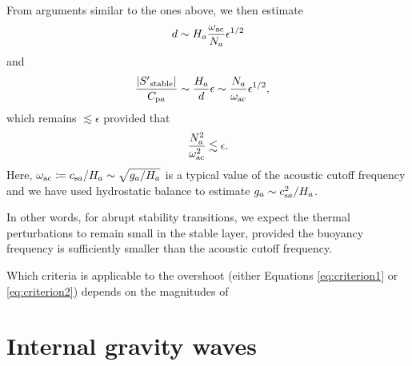 \documentclass[12pt]{article}
\newcommand{\csa}{c_{{\rm s}a}}
\newcommand{\cpa}{C_{{\rm p}a}}
\newcommand{\omac}{\omega_{\rm ac}}
\newcommand{\sstable}{|\entrprime_{\rm stable}|}
\begin{document}
 From arguments similar to the ones above, we then estimate
 \begin{align}
 	d\sim H_a\frac{\omac}{N_a}\epsilon^{1/2}
\end{align}
and 
\begin{align}\label{eq:entrpert2}
	\frac{\sstable}{\cpa} &\sim \frac{H_a}{d}\epsilon\sim \frac{N_a}{\omac}\epsilon^{1/2},
\end{align}
which remains $\lesssim\epsilon$ provided that 
\begin{align}\label{eq:criterion2}
	\frac{N_a^2}{\omac^2}\lesssim\epsilon.
\end{align}
Here, $\omac\define \csa/H_a\sim \sqrt{g_a/H_a}$ is a typical value of the acoustic cutoff frequency and we have used hydrostatic balance to estimate $g_a\sim \csa^2/H_a$. 

In other words, for abrupt stability transitions, we expect the thermal perturbations to remain small in the stable layer, provided the buoyancy frequency is sufficiently smaller than the acoustic cutoff frequency. 

Which criteria is applicable to the overshoot (either Equations \eqref{eq:criterion1} or \eqref{eq:criterion2}) depends on the magnitudes of 


\section{Internal gravity waves}\label{sec:gravitywaves}

	\newpage
		
\end{document}
